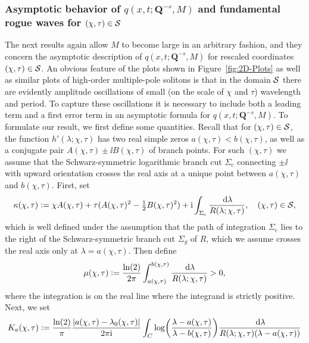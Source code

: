 \subsubsection{Asymptotic behavior of $q(x,t;\mathbf{Q}^{-s},M)$ and fundamental rogue waves for $(\chi,\tau)\in \mathcal{S}$}
\label{sec:Results-Shelves}
The next results again allow $M$ to become large in an arbitrary fashion, and they concern the asymptotic description of $q(x,t;\mathbf{Q}^{-s},M)$ for rescaled coordinates $(\chi,\tau)\in \mathcal{S}$.  An obvious feature of the plots shown in Figure~\ref{fig:2D-Plots} as well as similar plots of high-order multiple-pole solitons \cite{BilmanBW19} is that in the domain $\mathcal{S}$ there are evidently amplitude oscillations of small (on the scale of $\chi$ and $\tau$) wavelength and period.  To capture these oscillations it is necessary to include both a leading term and a first error term in an asymptotic formula for $q(x,t;\mathbf{Q}^{-s},M)$.  To formulate our result, we first define some quantities.  Recall that for $(\chi,\tau)\in \mathcal{S}$, the function $h'(\lambda;\chi,\tau)$ has two real simple zeros $a(\chi,\tau)<b(\chi,\tau)$, as well as a conjugate pair $A(\chi,\tau)\pm\ii B(\chi,\tau)$ of branch points.  For such $(\chi,\tau)$ we assume that the Schwarz-symmetric logarithmic branch cut $\Sigma_\mathrm{c}$ connecting $\pm\ii$ with upward orientation crosses the real axis at a unique point between $a(\chi,\tau)$ and $b(\chi,\tau)$.  First, set
\begin{equation}
\kappa(\chi,\tau)\vcentcolon= \chi A(\chi,\tau)+\tau(A(\chi,\tau)^2-\tfrac{1}{2}B(\chi,\tau)^2)+\mathrm{i}\int_{\Sigma_\mathrm{c}}\frac{\,\mathrm{d}\lambda}{R(\lambda;\chi,\tau)},\quad (\chi,\tau)\in \mathcal{S},
\label{eq:kappa-formula}
\end{equation}
which is well defined under the assumption that the path of integration $\Sigma_\mathrm{c}$ lies to the right of the Schwarz-symmetric branch cut $\Sigma_g$ of $R$, which we assume crosses the real axis only at $\lambda=a(\chi,\tau)$.  Then define
\begin{equation}
\mu(\chi,\tau)\vcentcolon=\frac{\ln(2)}{2\pi}\int_{a(\chi,\tau)}^{b(\chi,\tau)}\frac{\,\mathrm{d}\lambda}{R(\lambda;\chi,\tau)}>0,
\label{eq:mu-formula-intro}
\end{equation}
where the integration is on the real line where the integrand is strictly positive.  Next, we set
\begin{equation}
K_a(\chi,\tau)\defeq \frac{\ln(2)}{\pi}\frac{|a(\chi,\tau)-\lambda_0(\chi,\tau)|}{2\pi\ii}
\int_{C}\log\left(\frac{\lambda-a(\chi,\tau)}{\lambda-b(\chi,\tau)}\right)\frac{\dd\lambda}{R(\lambda;\chi,\tau)(\lambda-a(\chi,\tau))}
\label{eq:intro-Ka}
\end{equation}

